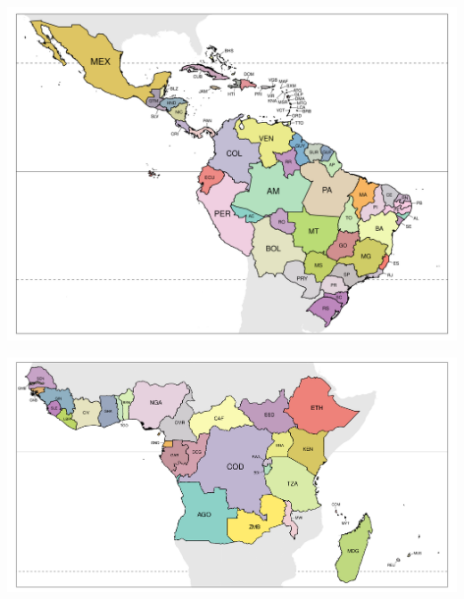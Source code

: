 \documentclass[12pt,]{article}
\begin{document}
\begin{center}\includegraphics[width=\textwidth]{figures/study_areas_America_ink} \end{center}

\begin{center}\includegraphics[width=\textwidth]{figures/study_areas_Africa_ink} \end{center}
\end{document}
